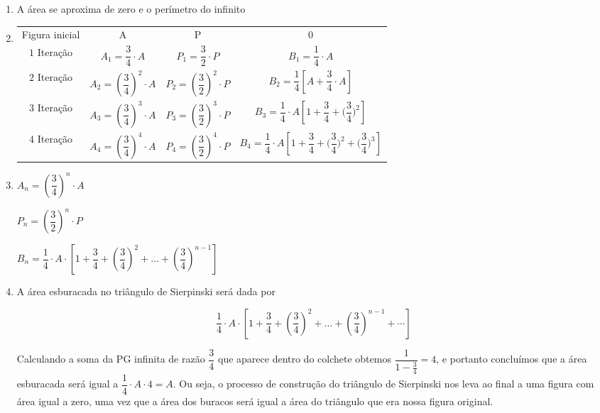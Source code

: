 \documentclass[10 pt,usenames,dvipsnames, oneside]{article}
\begin{document}
\ifdefined\prof
\begin{solucao}

\begin{enumerate}
\item A área se aproxima de zero e o perímetro do infinito

\item {}
{
\setlength\tabulinesep{2.5pt}
\setlength\tabcolsep{2.5pt}
\begin{tabu} to \linewidth{|c|c|c|c|}
\hline
{} &  &  &  \\ 
\hline
Figura inicial & A & P & 0 \\ 
\hline

$1$ Iteração & 
$A_1=\dfrac{3}{4}\cdot A$ & 
$P_1=\dfrac{3}{2}\cdot P$ & 
$B_1=\dfrac{1}{4}\cdot A$ \\ 
\hline

$2$ Iteração & 
$A_2=\left(\dfrac{3}{4}\right)^2\cdot A$ & 
$P_2=\left(\dfrac{3}{2}\right)^2\cdot P$ & 
$B_2=\dfrac{1}{4}\left[A+\dfrac{3}{4}\cdot A\right]$ \\ 
\hline

$3$ Iteração & 
$A_3=\left(\dfrac{3}{4}\right)^3\cdot A$ & 
$P_3=\left(\dfrac{3}{2}\right)^3\cdot P$ & 
$B_3=\dfrac{1}{4}\cdot A\left[1+\dfrac{3}{4}+\bigg(\dfrac{3}{4}\bigg)^2\right]$\\ 
\hline

$4$ Iteração & 
$A_4=\left(\dfrac{3}{4}\right)^4\cdot A$ & 
$P_4=\left(\dfrac{3}{2}\right)^4\cdot P$& 
$B_4=\dfrac{1}{4}\cdot A\left[1+\dfrac{3}{4}+\bigg(\dfrac{3}{4}\bigg)^2+\bigg(\dfrac{3}{4}\bigg)^3\right]$\\ 
\hline
\end{tabu}
}

\item{}
$A_n=\left(\dfrac{3}{4}\right)^n\cdot A$

$P_n=\left(\dfrac{3}{2}\right)^n\cdot P$

$B_n=\dfrac{1}{4}\cdot A \cdot \left[1+\dfrac{3}{4}+\left(\dfrac{3}{4}\right)^2+ \dots +\left(\dfrac{3}{4}\right)^{n-1}\right]$

\item{}
A área esburacada no triângulo de Sierpinski será dada por

\[
\dfrac{1}{4}\cdot A \cdot \left[1+\dfrac{3}{4}+\left(\dfrac{3}{4}\right)^2+ \dots +\left(\dfrac{3}{4}\right)^{n-1}+ \cdots \right]
\]

Calculando a soma da PG infinita de razão $\dfrac{3}{4}$ que aparece dentro do colchete obtemos $\dfrac{1}{1-\frac{3}{4}}=4$, e portanto concluímos que a área esburacada será igual a $\dfrac{1}{4}\cdot A \cdot 4 = A$. Ou seja, o processo de construção do triângulo de Sierpinski nos leva ao final a uma figura com área igual a zero, uma vez que a área dos buracos será igual a área do triângulo que era nossa figura original.

\end{enumerate}

\end{solucao}
\fi
\end{document}
